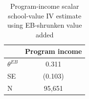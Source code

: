 \begin{table}[!htbp]
\centering
\caption{Program-income scalar school-value IV estimate using EB-shrunken value added}
\label{tab:scalar_school_value_iv_program_income_expected_va_eb}
\begin{tabular}{lc}
\toprule
 & Program income \\
\midrule
$\theta^{EB}$ & 0.311 \\
SE & (0.103) \\
N & 95,651 \\
\bottomrule
\end{tabular}
\end{table}
